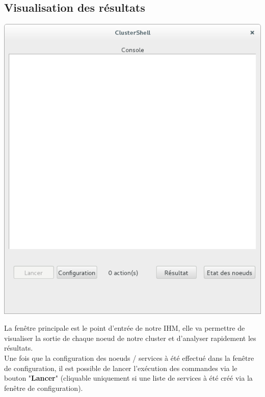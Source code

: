 \documentclass[a4paper,11pt]{article}
\begin{document}
\subsection{Visualisation des résultats}
\begin{center}
\includegraphics[scale=0.6]{fenetre_principale.png} 
\end{center}
La fenêtre principale est le point d'entrée de notre IHM, elle va permettre de visualiser la sortie de chaque noeud de notre cluster et d'analyser rapidement les résultats.\\
Une fois que la configuration des noeuds / services à été effectué dans la fenêtre de configuration, il est possible de lancer l'exécution des commandes via le bouton "\textbf{Lancer}" (cliquable uniquement si une liste de services à été créé via la fenêtre de configuration).\\
\end{document}
